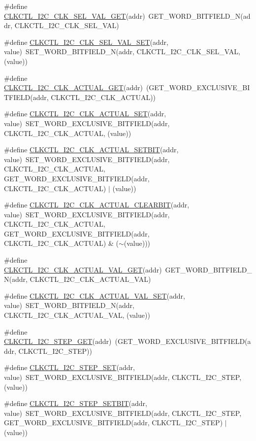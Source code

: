 \begin{DoxyCompactItemize}
\item 
\#define \hyperlink{a00544_a2e6d21462b7085ccb0fa7036e1f8f481}{CLKCTL\_\-I2C\_\-CLK\_\-SEL\_\-VAL\_\-GET}(addr)~GET\_\-WORD\_\-BITFIELD\_\-N(addr, CLKCTL\_\-I2C\_\-CLK\_\-SEL\_\-VAL)
\item 
\#define \hyperlink{a00544_a9d36af16ba274cb13f01901fd2362806}{CLKCTL\_\-I2C\_\-CLK\_\-SEL\_\-VAL\_\-SET}(addr, value)~SET\_\-WORD\_\-BITFIELD\_\-N(addr, CLKCTL\_\-I2C\_\-CLK\_\-SEL\_\-VAL, (value))
\item 
\#define \hyperlink{a00544_a9c226d51f0e3ab829aa115bd79aa140c}{CLKCTL\_\-I2C\_\-CLK\_\-ACTUAL\_\-GET}(addr)~(GET\_\-WORD\_\-EXCLUSIVE\_\-BITFIELD(addr, CLKCTL\_\-I2C\_\-CLK\_\-ACTUAL))
\item 
\#define \hyperlink{a00544_ac78ab9c109de1ea2cfdb09dfa5c89c0d}{CLKCTL\_\-I2C\_\-CLK\_\-ACTUAL\_\-SET}(addr, value)~SET\_\-WORD\_\-EXCLUSIVE\_\-BITFIELD(addr, CLKCTL\_\-I2C\_\-CLK\_\-ACTUAL, (value))
\item 
\#define \hyperlink{a00544_a9be1e4693fadfbd4ee281f57360d0225}{CLKCTL\_\-I2C\_\-CLK\_\-ACTUAL\_\-SETBIT}(addr, value)~SET\_\-WORD\_\-EXCLUSIVE\_\-BITFIELD(addr, CLKCTL\_\-I2C\_\-CLK\_\-ACTUAL, GET\_\-WORD\_\-EXCLUSIVE\_\-BITFIELD(addr, CLKCTL\_\-I2C\_\-CLK\_\-ACTUAL) $|$ (value))
\item 
\#define \hyperlink{a00544_aea57a0bd5a11723fcef10a8f4830a630}{CLKCTL\_\-I2C\_\-CLK\_\-ACTUAL\_\-CLEARBIT}(addr, value)~SET\_\-WORD\_\-EXCLUSIVE\_\-BITFIELD(addr, CLKCTL\_\-I2C\_\-CLK\_\-ACTUAL, GET\_\-WORD\_\-EXCLUSIVE\_\-BITFIELD(addr, CLKCTL\_\-I2C\_\-CLK\_\-ACTUAL) \& ($\sim$(value)))
\item 
\#define \hyperlink{a00544_a5debb0452acec206adc03f4ab9beacad}{CLKCTL\_\-I2C\_\-CLK\_\-ACTUAL\_\-VAL\_\-GET}(addr)~GET\_\-WORD\_\-BITFIELD\_\-N(addr, CLKCTL\_\-I2C\_\-CLK\_\-ACTUAL\_\-VAL)
\item 
\#define \hyperlink{a00544_afdac1d2ac26bfd49ff07a38e8d6cfb3c}{CLKCTL\_\-I2C\_\-CLK\_\-ACTUAL\_\-VAL\_\-SET}(addr, value)~SET\_\-WORD\_\-BITFIELD\_\-N(addr, CLKCTL\_\-I2C\_\-CLK\_\-ACTUAL\_\-VAL, (value))
\item 
\#define \hyperlink{a00544_a0390cd2d2a4260b350fdb1917aee5647}{CLKCTL\_\-I2C\_\-STEP\_\-GET}(addr)~(GET\_\-WORD\_\-EXCLUSIVE\_\-BITFIELD(addr, CLKCTL\_\-I2C\_\-STEP))
\item 
\#define \hyperlink{a00544_ab8c167c1f45f46046b979945056f7ccb}{CLKCTL\_\-I2C\_\-STEP\_\-SET}(addr, value)~SET\_\-WORD\_\-EXCLUSIVE\_\-BITFIELD(addr, CLKCTL\_\-I2C\_\-STEP, (value))
\item 
\#define \hyperlink{a00544_abb776e427df5eb76dba96907a65ce35b}{CLKCTL\_\-I2C\_\-STEP\_\-SETBIT}(addr, value)~SET\_\-WORD\_\-EXCLUSIVE\_\-BITFIELD(addr, CLKCTL\_\-I2C\_\-STEP, GET\_\-WORD\_\-EXCLUSIVE\_\-BITFIELD(addr, CLKCTL\_\-I2C\_\-STEP) $|$ (value))

\end{DoxyCompactItemize}
